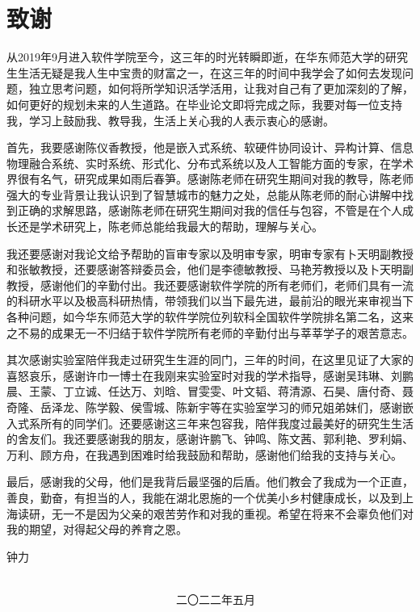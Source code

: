 {\kaishu
	\chapter*{致\qquad 谢}
	从2019年9月进入软件学院至今，这三年的时光转瞬即逝，在华东师范大学的研究生生活无疑是我人生中宝贵的财富之一，在这三年的时间中我学会了如何去发现问题，独立思考问题，如何将所学知识活学活用，让我对自己有了更加深刻的了解，如何更好的规划未来的人生道路。在毕业论文即将完成之际，我要对每一位支持我，学习上鼓励我、教导我，生活上关心我的人表示衷心的感谢。
	
	首先，我要感谢陈仪香教授，他是嵌入式系统、软硬件协同设计、异构计算、信息物理融合系统、实时系统、形式化、分布式系统以及人工智能方面的专家，在学术界很有名气，研究成果如雨后春笋。感谢陈老师在研究生期间对我的教导，陈老师强大的专业背景让我认识到了智慧城市的魅力之处，总能从陈老师的耐心讲解中找到正确的求解思路，感谢陈老师在研究生期间对我的信任与包容，不管是在个人成长还是学术研究上，陈老师总能给我最大的帮助，理解与关心。
	
	我还要感谢对我论文给予帮助的盲审专家以及明审专家，明审专家有卜天明副教授和张敏教授，还要感谢答辩委员会，他们是李德敏教授、马艳芳教授以及卜天明副教授，感谢他们的辛勤付出。我还要感谢软件学院的所有老师们，老师们具有一流的科研水平以及极高科研热情，带领我们以当下最先进，最前沿的眼光来审视当下各种问题，如今华东师范大学的软件学院位列软科全国软件学院排名第二名，这来之不易的成果无一不归结于软件学院所有老师的辛勤付出与莘莘学子的艰苦意志。
	
	其次感谢实验室陪伴我走过研究生生涯的同门，三年的时间，在这里见证了大家的喜怒哀乐，感谢许巾一博士在我刚来实验室时对我的学术指导，感谢吴玮琳、刘鹏晨、王蒙、丁立诚、任达万、刘晗、冒雯雯、叶文韬、蒋清源、石昊、唐付奇、聂奇隆、岳泽龙、陈学毅、侯雪城、陈新宇等在实验室学习的师兄姐弟妹们，感谢嵌入式系所有的同学们。还要感谢这三年来包容我，陪伴我度过最美好的研究生生活的舍友们。我还要感谢我的朋友，感谢许鹏飞、钟鸣、陈文茜、郭利艳、罗利娟、万利、顾方舟，在我遇到困难时给我鼓励和帮助，感谢他们给我的支持与关心。
	
	最后，感谢我的父母，他们是我背后最坚强的后盾。他们教会了我成为一个正直，善良，勤奋，有担当的人，我能在湖北恩施的一个优美小乡村健康成长，以及到上海读研，无一不是因为父亲的艰苦劳作和对我的重视。希望在将来不会辜负他们对我的期望，对得起父母的养育之恩。

\vspace{0.2cm} \hspace{11.5cm}
钟力
\hspace{10.6cm} 

~~~~~~~~~~~~~~~~~~~~~~~~~~~~~~~~~~~~~~~~~~~~~~~~~~~~~~~~~~~~~~~~~~~~~~~~~~~~~~~~~~~~~~~~~~~~~~~~~~~~~~二〇二二年五月 }
